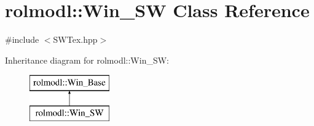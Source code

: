\hypertarget{classrolmodl_1_1_win___s_w}{}\section{rolmodl\+::Win\+\_\+\+SW Class Reference}
\label{classrolmodl_1_1_win___s_w}


{\ttfamily \#include $<$S\+W\+Tex.\+hpp$>$}

Inheritance diagram for rolmodl\+::Win\+\_\+\+SW\+:\begin{figure}[H]
\begin{center}
\leavevmode
\includegraphics[height=2.000000cm]{classrolmodl_1_1_win___s_w}
\end{center}
\end{figure}
